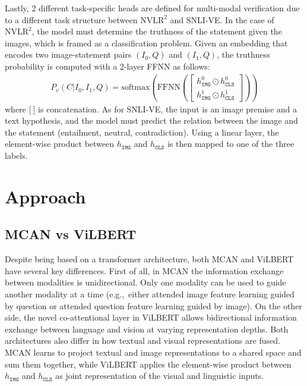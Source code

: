 \documentclass{article}
\begin{document}
Lastly, 2 different task-specific heads are defined for multi-modal verification due to a different task structure between $\text{NVLR}^2$ and SNLI-VE. In the case of $\text{NVLR}^{2}$, the model must determine the truthness of the statement given the images, which is framed as a classification problem. Given an embedding that encodes two image-statement pairs $(I_{0}, Q)$ and $(I_{1}, Q)$, the truthness probability is computed with a 2-layer FFNN as follows:
\begin{align}
    P_{v}(C|I_{0}, I_{1}, Q) = \text{softmax}\left(\text{FFNN}\left(\begin{bmatrix} 
    h_{\mathtt{IMG}}^{0} \odot h_{\mathtt{CLS}}^{0} \\
    h_{\mathtt{IMG}}^{1} \odot h_{\mathtt{CLS}}^{1}
    \end{bmatrix}\right)\right)
\end{align}
where $\mathbb{[}\: \mathbb{]}$ is concatenation. As for SNLI-VE, the input is an image premise and a text hypothesis, and the model must predict the relation between the image and the statement (entailment, neutral, contradiction). Using a linear layer, the element-wise product between $h_{\mathtt{IMG}}$ and $h_{\mathtt{CLS}}$ is then mapped to one of the three labels.



\section{Approach}
\subsection{MCAN vs ViLBERT}
Despite being based on a transformer architecture, both MCAN and ViLBERT have several key differences. First of all, in MCAN the information exchange between modalities is unidirectional. Only one modality can be used to guide another modality at a time (e.g.,\ either attended image feature learning guided by question or attended question feature learning guided by image). On the other side, the novel co-attentional layer in ViLBERT allows bidirectional information exchange between language and vision at varying representation depths. Both architectures also differ in how textual and visual representations are fused. MCAN learns to project textual and image representations to a shared space and sum them together, while ViLBERT applies the element-wise product between $h_{\mathtt{IMG}}$ and $h_{\mathtt{CLS}}$ as joint representation of the visual and linguistic inputs. 
\end{document}
